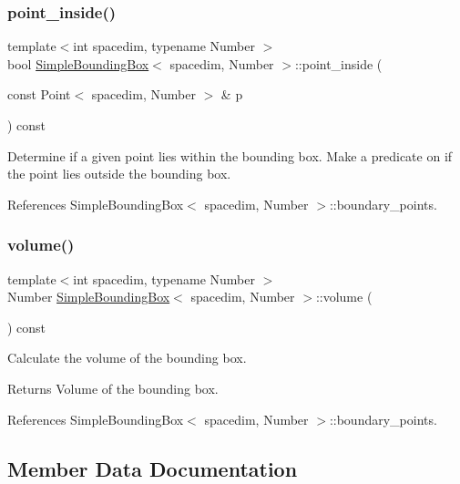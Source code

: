 \subsubsection{\texorpdfstring{point\+\_\+inside()}{point\_inside()}}
{\footnotesize\ttfamily template$<$int spacedim, typename Number $>$ \\
bool \hyperlink{classSimpleBoundingBox}{Simple\+Bounding\+Box}$<$ spacedim, Number $>$\+::point\+\_\+inside (\begin{DoxyParamCaption}\item[{const Point$<$ spacedim, Number $>$ \&}]{p }\end{DoxyParamCaption}) const}

Determine if a given point lies within the bounding box. Make a predicate on if the point lies outside the bounding box.

References Simple\+Bounding\+Box$<$ spacedim, Number $>$\+::boundary\+\_\+points.

\mbox{\label{classSimpleBoundingBox_a44340fd2ab10e9c05c1a88719958fee5}} 
\subsubsection{\texorpdfstring{volume()}{volume()}}
{\footnotesize\ttfamily template$<$int spacedim, typename Number $>$ \\
Number \hyperlink{classSimpleBoundingBox}{Simple\+Bounding\+Box}$<$ spacedim, Number $>$\+::volume (\begin{DoxyParamCaption}{ }\end{DoxyParamCaption}) const}

Calculate the volume of the bounding box. \begin{DoxyReturn}{Returns}
Volume of the bounding box. 
\end{DoxyReturn}


References Simple\+Bounding\+Box$<$ spacedim, Number $>$\+::boundary\+\_\+points.



\subsection{Member Data Documentation}
\mbox{\label{classSimpleBoundingBox_a066f18179d514c16ac68baa5ebd85ba5}} 
